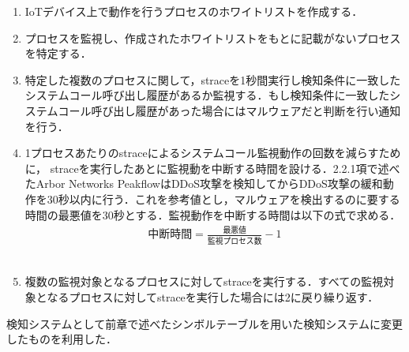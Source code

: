\begin{enumerate}
 \item IoTデバイス上で動作を行うプロセスのホワイトリストを作成する．
 \item プロセスを監視し、作成されたホワイトリストをもとに記載がないプロセスを特定する．
 \item 特定した複数のプロセスに関して，straceを1秒間実行し検知条件に一致したシステムコール呼び出し履歴があるか監視する．もし検知条件に一致したシステムコール呼び出し履歴があった場合にはマルウェアだと判断を行い通知を行う．
 
 \item 1プロセスあたりのstraceによるシステムコール監視動作の回数を減らすために，
 straceを実行したあとに監視動を中断する時間を設ける．2.2.1項で述べたArbor Networks PeakflowはDDoS攻撃を検知してからDDoS攻撃の緩和動作を30秒以内に行う．これを参考値とし，マルウェアを検出するのに要する時間の最悪値を30秒とする．監視動作を中断する時間は以下の式で求める．
 \begin{eqnarray}
 中断時間  =  \frac{最悪値}{監視プロセス数}-1
 \end{eqnarray}
　\item 複数の監視対象となるプロセスに対してstraceを実行する．すべての監視対象となるプロセスに対してstraceを実行した場合には2に戻り繰り返す．
 \end{enumerate}
 
 検知システムとして前章で述べたシンボルテーブルを用いた検知システムに変更したものを利用した．


 
 

